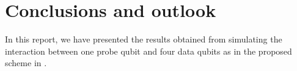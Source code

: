 \section{Conclusions and outlook }
In this report, we have presented the results obtained from simulating the interaction between one probe qubit and four data qubits as in the proposed scheme in \cite{the paper}. 

